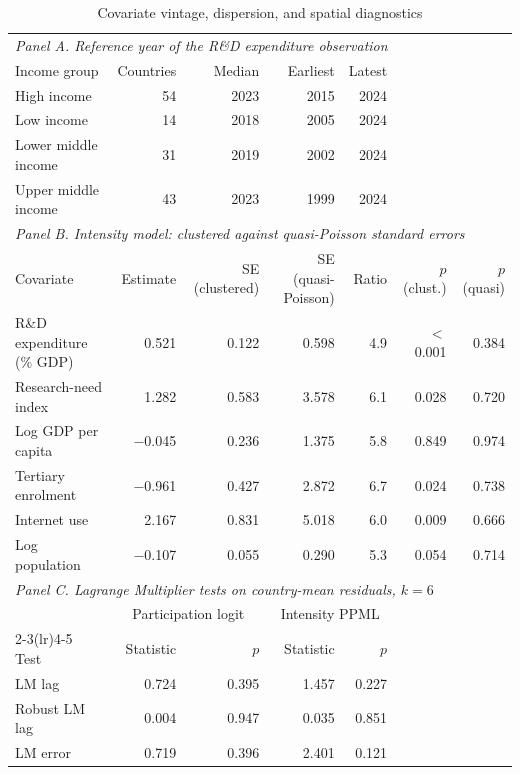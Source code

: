 \begin{table}[!t]
\centering
\footnotesize
\caption{Covariate vintage, dispersion, and spatial diagnostics}
\label{tab:diagnostics}
\begin{tabular*}{\textwidth}{@{\extracolsep\fill}l r r r r r r@{}}
\toprule
\multicolumn{7}{l}{\textit{Panel A. Reference year of the R\&D expenditure observation}} \\
Income group & Countries & Median & Earliest & Latest & \multicolumn{2}{c}{} \\
\midrule
High income & 54 & 2023 & 2015 & 2024 & \multicolumn{2}{c}{} \\
Low income & 14 & 2018 & 2005 & 2024 & \multicolumn{2}{c}{} \\
Lower middle income & 31 & 2019 & 2002 & 2024 & \multicolumn{2}{c}{} \\
Upper middle income & 43 & 2023 & 1999 & 2024 & \multicolumn{2}{c}{} \\
\midrule
\multicolumn{7}{l}{\textit{Panel B. Intensity model: clustered against quasi-Poisson standard errors}} \\
Covariate & Estimate & SE (clustered) & SE (quasi-Poisson) & Ratio & $p$ (clust.) & $p$ (quasi) \\
\midrule
R\&D expenditure (\% GDP) & 0.521 & 0.122 & 0.598 & 4.9 & $<$0.001 & 0.384 \\
Research-need index & 1.282 & 0.583 & 3.578 & 6.1 & 0.028 & 0.720 \\
Log GDP per capita & $-$0.045 & 0.236 & 1.375 & 5.8 & 0.849 & 0.974 \\
Tertiary enrolment & $-$0.961 & 0.427 & 2.872 & 6.7 & 0.024 & 0.738 \\
Internet use & 2.167 & 0.831 & 5.018 & 6.0 & 0.009 & 0.666 \\
Log population & $-$0.107 & 0.055 & 0.290 & 5.3 & 0.054 & 0.714 \\
\midrule
\multicolumn{7}{l}{\textit{Panel C. Lagrange Multiplier tests on country-mean residuals, $k=6$}} \\
& \multicolumn{2}{c}{Participation logit} & \multicolumn{2}{c}{Intensity PPML} & \multicolumn{2}{c}{} \\
\cmidrule(lr){2-3}\cmidrule(lr){4-5}
Test & Statistic & $p$ & Statistic & $p$ & \multicolumn{2}{c}{} \\
\midrule
LM lag & 0.724 & 0.395 & 1.457 & 0.227 & \\
Robust LM lag & 0.004 & 0.947 & 0.035 & 0.851 & \\
LM error & 0.719 & 0.396 & 2.401 & 0.121 & \\

\end{tabular*}
\end{table}

